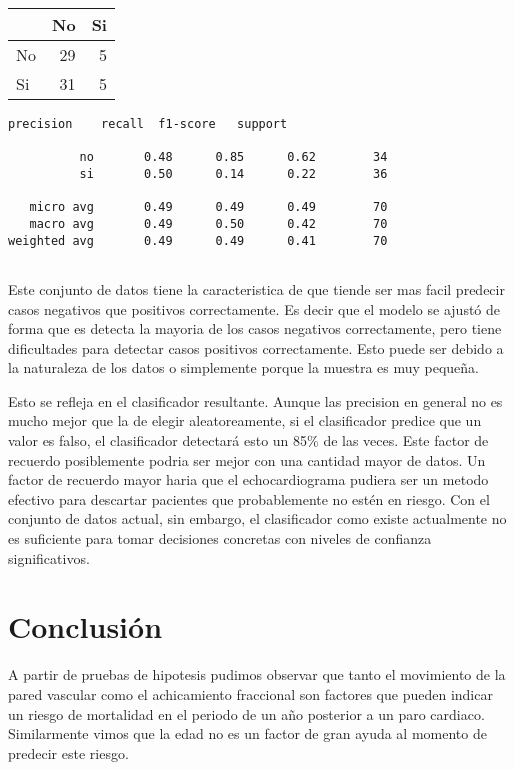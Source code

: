 \documentclass[11pt]{article}
\begin{document}
    \begin{tabular}{lrr}
\toprule
{} &  No &  Si \\
\midrule
No &  29 &   5 \\
Si &  31 &   5 \\
\bottomrule
\end{tabular}


    
    \begin{Verbatim}[commandchars=\\\{\}]
              precision    recall  f1-score   support

          no       0.48      0.85      0.62        34
          si       0.50      0.14      0.22        36

   micro avg       0.49      0.49      0.49        70
   macro avg       0.49      0.50      0.42        70
weighted avg       0.49      0.49      0.41        70


    \end{Verbatim}

    Este conjunto de datos tiene la caracteristica de que tiende ser mas
facil predecir casos negativos que positivos correctamente. Es decir que
el modelo se ajustó de forma que es detecta la mayoria de los casos
negativos correctamente, pero tiene dificultades para detectar casos
positivos correctamente. Esto puede ser debido a la naturaleza de los
datos o simplemente porque la muestra es muy pequeña.

Esto se refleja en el clasificador resultante. Aunque las precision en
general no es mucho mejor que la de elegir aleatoreamente, si el
clasificador predice que un valor es falso, el clasificador detectará
esto un 85\% de las veces. Este factor de recuerdo posiblemente podria
ser mejor con una cantidad mayor de datos. Un factor de recuerdo mayor
haria que el echocardiograma pudiera ser un metodo efectivo para
descartar pacientes que probablemente no estén en riesgo. Con el
conjunto de datos actual, sin embargo, el clasificador como existe
actualmente no es suficiente para tomar decisiones concretas con niveles
de confianza significativos.

    \hypertarget{conclusiuxf3n}{%
\section{Conclusión}\label{conclusiuxf3n}}

A partir de pruebas de hipotesis pudimos observar que tanto el
movimiento de la pared vascular como el achicamiento fraccional son
factores que pueden indicar un riesgo de mortalidad en el periodo de un
año posterior a un paro cardiaco. Similarmente vimos que la edad no es
un factor de gran ayuda al momento de predecir este riesgo.
\end{document}
